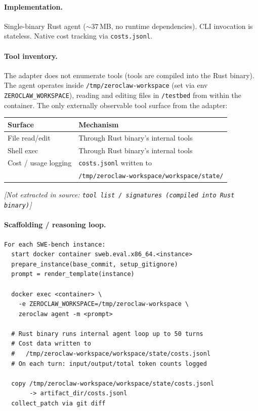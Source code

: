 \paragraph{Implementation.}
Single-binary Rust agent (${\sim}37$\,MB, no runtime dependencies). CLI invocation is stateless. Native cost tracking via \texttt{costs.jsonl}.

\paragraph{Tool inventory.}
The adapter does not enumerate tools (tools are compiled into the Rust binary). The agent operates inside \texttt{/tmp/zeroclaw-workspace} (set via env \texttt{ZEROCLAW\_WORKSPACE}), reading and editing files in \texttt{/testbed} from within the container. The only externally observable tool surface from the adapter:

\begin{center}
\begin{tabular}{ll}
\toprule
\textbf{Surface} & \textbf{Mechanism} \\
\midrule
File read/edit          & Through Rust binary's internal tools \\
Shell exec              & Through Rust binary's internal tools \\
Cost / usage logging    & \texttt{costs.jsonl} written to \\
                        & \texttt{/tmp/zeroclaw-workspace/workspace/state/} \\
\bottomrule
\end{tabular}
\end{center}

\textit{[Not extracted in source: \texttt{tool list / signatures (compiled into Rust binary)}]}

\paragraph{Scaffolding / reasoning loop.}
\begin{verbatim}
For each SWE-bench instance:
  start docker container sweb.eval.x86_64.<instance>
  prepare_instance(base_commit, setup_gitignore)
  prompt = render_template(instance)

  docker exec <container> \
    -e ZEROCLAW_WORKSPACE=/tmp/zeroclaw-workspace \
    zeroclaw agent -m <prompt>

  # Rust binary runs internal agent loop up to 50 turns
  # Cost data written to
  #   /tmp/zeroclaw-workspace/workspace/state/costs.jsonl
  # On each turn: input/output/total token counts logged

  copy /tmp/zeroclaw-workspace/workspace/state/costs.jsonl
       -> artifact_dir/costs.jsonl
  collect_patch via git diff
\end{verbatim}

